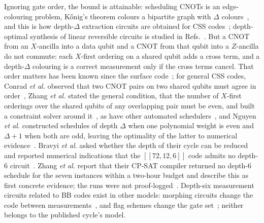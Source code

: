 \documentclass[reprint,twocolumn,superscriptaddress,nofootinbib]{revtex4-2}
\theoremstyle{plain}
\begin{document}
Ignoring gate order, the bound is attainable: scheduling CNOTs is an
edge-colouring problem, K\H{o}nig's theorem colours a bipartite graph with
$\Delta$ colours~\cite{Konig1916}, and this is how depth-$\Delta$
extraction circuits are obtained for CSS codes~\cite{TDB2022};
depth-optimal synthesis of linear reversible circuits is studied in
Refs.~\cite{PMH2008,Jiang2020,MaslovZindorf2022,Kutin2007,Bataille2022}.
But a CNOT from an $X$-ancilla into a data qubit and a CNOT from that qubit
into a $Z$-ancilla do not commute: each $X$-first ordering on a shared
qubit adds a cross term, and a depth-$\Delta$ colouring is a correct
measurement only if the cross terms cancel. That order matters has been
known since the surface code~\cite{DKLP2002,Fowler2012,TomitaSvore2014};
for general CSS codes, Conrad \emph{et al.} observed that two CNOT pairs on
two shared qubits must agree in order~\cite{Conrad2018}, Zhang
\emph{et al.} stated the general condition, that the number of $X$-first
orderings over the shared qubits of any overlapping pair must be even, and
built a constraint solver around it~\cite{Zhang2026ASC}, as have other
automated schedulers~\cite{Liu2026AlphaSyndrome,Viszlai2026PropHunt}, and
Nguyen \emph{et al.} constructed schedules of depth $\Delta$ when one
polynomial weight is even and $\Delta+1$ when both are odd, leaving the
optimality of the latter to numerical evidence~\cite{Nguyen2026}. Bravyi
\emph{et al.} asked whether the depth of their cycle can be reduced and
reported numerical indications that the $[[72,12,6]]$ code admits no
depth-$6$ circuit~\cite[Sec.~10]{Bravyi2023arXiv}. Zhang \emph{et al.}
report that their CP-SAT compiler returned no depth-$6$ schedule for the
seven instances within a two-hour budget and describe this as first concrete
evidence; the runs were not proof-logged~\cite{Zhang2026ASC}. Depth-six
measurement circuits related to BB codes exist in other models: morphing
circuits change the code between measurements~\cite{ShawTerhal2025,
ShawTerhal2026}, and flag schemes change the gate
set~\cite{ChamberlandBeverland2018,ChaoReichardt2018}; neither belongs to
the published cycle's model.
\end{document}
